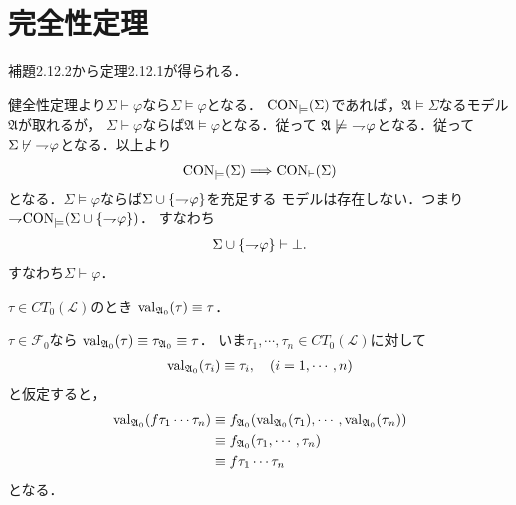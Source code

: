\section{完全性定理}
	\begin{screen}
		\begin{thm}[補題2.12.3]
			補題2.12.2から定理2.12.1が得られる．
		\end{thm}
	\end{screen}
	
	\begin{sketch}
		健全性定理より$\Sigma \vdash \varphi$なら$\Sigma \models \varphi$となる．
		$\operatorname{CON}_{\models}(\Sigma)$であれば，$\mathfrak{A} \models \Sigma$なるモデル$\mathfrak{A}$が取れるが，
		$\Sigma \vdash \varphi$ならば$\mathfrak{A} \models \varphi$となる．従って
		$\mathfrak{A} \not\models\ \rightharpoondown\hspace{-0.25em} \varphi$となる．従って
		$\Sigma \not\vdash\ \rightharpoondown\hspace{-0.25em} \varphi$となる．以上より
		\begin{align}
			\operatorname{CON}_{\models}(\Sigma) \Longrightarrow \operatorname{CON}_{\vdash}(\Sigma)
		\end{align}
		となる．$\Sigma \models \varphi$ならば$\Sigma \cup \{\rightharpoondown\hspace{-0.25em} \varphi\}$を充足する
		モデルは存在しない．つまり$\rightharpoondown\hspace{-0.25em} \operatorname{CON}_{\models}(\Sigma \cup \{\rightharpoondown\hspace{-0.25em} \varphi\})$．
		すなわち
		\begin{align}
			\Sigma \cup \{\rightharpoondown\hspace{-0.25em} \varphi\} \vdash \bot.
		\end{align}
		すなわち$\Sigma \vdash \varphi$．
		\QED
	\end{sketch}
	
	\begin{screen}
		\begin{thm}[補題2.12.6]
			$\tau \in CT_{0}(\mathcal{L})$のとき
			$\operatorname{val}_{\mathfrak{A}_{0}}(\tau) \equiv \tau$．
		\end{thm}
	\end{screen}
	
	\begin{sketch}
		$\tau \in \mathcal{F}_{0}$なら
		$\operatorname{val}_{\mathfrak{A}_{0}}(\tau) \equiv \tau_{\mathfrak{A}_{0}} \equiv \tau$．
		いま$\tau_{1},\cdots,\tau_{n} \in CT_{0}(\mathcal{L})$に対して
		\begin{align}
			\operatorname{val}_{\mathfrak{A}_{0}}(\tau_{i}) \equiv \tau_{i},
			\quad (i=1,\cdots,n)
		\end{align}
		と仮定すると，
		\begin{align}
			\operatorname{val}_{\mathfrak{A}_{0}}(f\tau_{1}\cdots\tau_{n}) 
			&\equiv f_{\mathfrak{A}_{0}}(\operatorname{val}_{\mathfrak{A}_{0}}(\tau_{1}),\cdots,\operatorname{val}_{\mathfrak{A}_{0}}(\tau_{n})) \\
			&\equiv f_{\mathfrak{A}_{0}}(\tau_{1},\cdots,\tau_{n}) \\
			&\equiv f\tau_{1}\cdots\tau_{n}
		\end{align}
		となる．
	\end{sketch}
	
